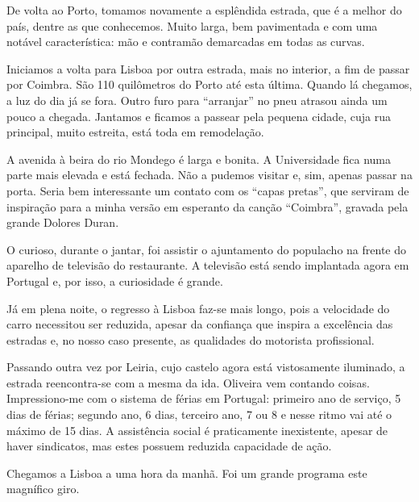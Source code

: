 De volta ao Porto, tomamos novamente a esplêndida estrada, que é a melhor do país, dentre as que conhecemos. Muito larga, bem pavimentada e com uma notável característica: mão e contramão demarcadas em todas as curvas.

Iniciamos a volta para Lisboa por outra estrada, mais no interior, a fim de passar por Coimbra. São 110 quilômetros do Porto até esta última. Quando lá chegamos, a luz do dia já se fora. Outro furo para “arranjar” no pneu atrasou ainda um pouco a chegada. Jantamos e ficamos a passear pela pequena cidade, cuja rua principal, muito estreita, está toda em remodelação.

A avenida à beira do rio Mondego é larga e bonita. A Universidade fica numa parte mais elevada e está fechada. Não a pudemos visitar e, sim, apenas passar na porta. Seria bem interessante um contato com os “capas pretas”, que serviram de inspiração para a minha versão em esperanto da canção “Coimbra”, gravada pela grande Dolores Duran.

O curioso, durante o jantar, foi assistir o ajuntamento do populacho na frente do aparelho de televisão do restaurante. A televisão está sendo implantada agora em Portugal e, por isso, a curiosidade é grande.

Já em plena noite, o regresso à Lisboa faz-se mais longo, pois a velocidade do carro necessitou ser reduzida, apesar da confiança que inspira a excelência das estradas e, no nosso caso presente, as qualidades do motorista profissional.

Passando outra vez por Leiria, cujo castelo agora está vistosamente iluminado, a estrada reencontra-se com a mesma da ida. Oliveira vem contando coisas. Impressiono-me com o sistema de férias em Portugal: primeiro ano de serviço, 5 dias de férias; segundo ano, 6 dias, terceiro ano, 7 ou 8 e nesse ritmo vai até o máximo de 15 dias. A assistência social é praticamente inexistente, apesar de haver sindicatos, mas estes possuem reduzida capacidade de ação.

Chegamos a Lisboa a uma hora da manhã. Foi um grande programa este magnífico giro.

